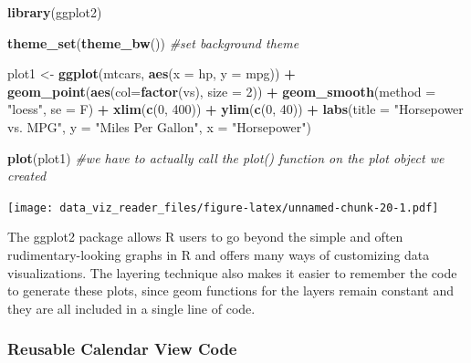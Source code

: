 \documentclass[]{book}
\newenvironment{Shaded}{\begin{snugshade}}{\end{snugshade}}
\newcommand{\KeywordTok}[1]{\textcolor[rgb]{0.13,0.29,0.53}{\textbf{#1}}}
\newcommand{\DataTypeTok}[1]{\textcolor[rgb]{0.13,0.29,0.53}{#1}}
\newcommand{\DecValTok}[1]{\textcolor[rgb]{0.00,0.00,0.81}{#1}}
\newcommand{\StringTok}[1]{\textcolor[rgb]{0.31,0.60,0.02}{#1}}
\newcommand{\CommentTok}[1]{\textcolor[rgb]{0.56,0.35,0.01}{\textit{#1}}}
\newcommand{\OperatorTok}[1]{\textcolor[rgb]{0.81,0.36,0.00}{\textbf{#1}}}
\newcommand{\NormalTok}[1]{#1}
\begin{document}
\begin{Shaded}
\begin{Highlighting}[]
\KeywordTok{library}\NormalTok{(ggplot2)}

\KeywordTok{theme_set}\NormalTok{(}\KeywordTok{theme_bw}\NormalTok{())  }\CommentTok{#set background theme}

\NormalTok{plot1 <-}\StringTok{ }\KeywordTok{ggplot}\NormalTok{(mtcars, }\KeywordTok{aes}\NormalTok{(}\DataTypeTok{x =}\NormalTok{ hp, }\DataTypeTok{y =}\NormalTok{ mpg)) }\OperatorTok{+}\StringTok{ }\KeywordTok{geom_point}\NormalTok{(}\KeywordTok{aes}\NormalTok{(}\DataTypeTok{col=}\KeywordTok{factor}\NormalTok{(vs), }\DataTypeTok{size =} \DecValTok{2}\NormalTok{)) }\OperatorTok{+}\StringTok{ }\KeywordTok{geom_smooth}\NormalTok{(}\DataTypeTok{method =} \StringTok{"loess"}\NormalTok{, }\DataTypeTok{se =}\NormalTok{ F) }\OperatorTok{+}\StringTok{ }\KeywordTok{xlim}\NormalTok{(}\KeywordTok{c}\NormalTok{(}\DecValTok{0}\NormalTok{, }\DecValTok{400}\NormalTok{)) }\OperatorTok{+}\StringTok{ }\KeywordTok{ylim}\NormalTok{(}\KeywordTok{c}\NormalTok{(}\DecValTok{0}\NormalTok{, }\DecValTok{40}\NormalTok{)) }\OperatorTok{+}\StringTok{ }\KeywordTok{labs}\NormalTok{(}\DataTypeTok{title =} \StringTok{"Horsepower vs. MPG"}\NormalTok{, }\DataTypeTok{y =} \StringTok{"Miles Per Gallon"}\NormalTok{, }\DataTypeTok{x =} \StringTok{"Horsepower"}\NormalTok{)}

\KeywordTok{plot}\NormalTok{(plot1)  }\CommentTok{#we have to actually call the plot() function on the plot object we created}
\end{Highlighting}
\end{Shaded}

\texttt{[image: data\_viz\_reader\_files/figure-latex/unnamed-chunk-20-1.pdf]}

The ggplot2 package allows R users to go beyond the simple and often
rudimentary-looking graphs in R and offers many ways of customizing data
visualizations. The layering technique also makes it easier to remember
the code to generate these plots, since geom functions for the layers
remain constant and they are all included in a single line of code.

\subsubsection{Reusable Calendar View
Code}\label{reusable-calendar-view-code}
\end{document}
